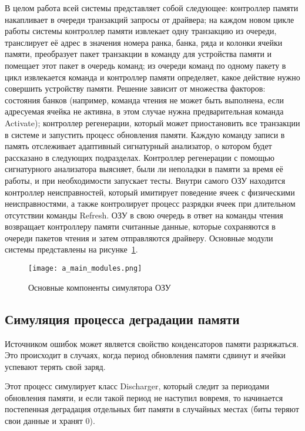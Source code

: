 В целом работа всей системы представляет собой следующее: контроллер памяти накапливает в очереди транзакций запросы от драйвера; на каждом новом цикле работы системы контроллер памяти извлекает одну транзакцию из очереди, транслирует её адрес в значения номера ранка, банка, ряда и колонки ячейки памяти, преобразует пакет транзакции в команду для устройства памяти и помещает этот пакет в очередь команд; из очереди команд по одному пакету в цикл извлекается команда и контроллер памяти определяет, какое действие нужно совершить устройству памяти. Решение  зависит от множества факторов: состояния банков (например, команда чтения не может быть выполнена, если адресуемая ячейка не активна, в этом случае нужна предварительная команда Activate); контроллер регенерации, который может приостановить все транзакции в системе и запустить процесс обновления памяти. Каждую команду записи в память отслеживает адаптивный сигнатурный анализатор, о котором будет рассказано в следующих подразделах. Контроллер регенерации с помощью сигнатурного анализатора выясняет, были ли неполадки в памяти за время её работы, и при необходимости запускает тесты. Внутри самого ОЗУ находится контроллер неисправностей, который имитирует поведение ячеек с физическими неисправностями, а также контролирует процесс разрядки ячеек при длительном отсутствии команды Refresh. ОЗУ в свою очередь в ответ на команды чтения возвращает контроллеру памяти считанные данные, которые сохраняются в очереди пакетов чтения и затем отправляются драйверу. Основные модули системы представлены на рисунке~\ref{fig:arch_and_mod:modules:main_modules}.

\begin{figure}[ht]
\centering
  \texttt{[image: a\_main\_modules.png]}  
  \caption{Основные компоненты симулятора ОЗУ}
  \label{fig:arch_and_mod:modules:main_modules}
\end{figure}

\subsection{Симуляция процесса деградации памяти}
\label{sub:arch_and_mod:memory_discharge}
Источником ошибок может является свойство конденсаторов памяти разряжаться. Это происходит в случаях, когда период обновления памяти сдвинут и ячейки успевают терять свой заряд.

Этот процесс симулирует класс Discharger, который следит за периодами обновления памяти, и если такой период не наступил вовремя, то начинается постепенная деградация отдельных бит памяти в случайных местах (биты теряют свои данные и хранят 0). 

